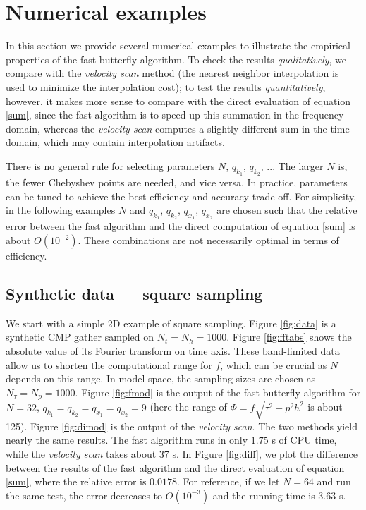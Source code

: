 

\section{Numerical examples}

In this section we provide several numerical examples to illustrate the empirical properties of the fast butterfly algorithm. To check the results {\it qualitatively}, we compare with the {\it velocity scan} method (the nearest neighbor interpolation is used to minimize the interpolation cost); to test the results {\it quantitatively}, however, it makes more sense to compare with the direct evaluation of equation \ref{sum}, since the fast algorithm is to speed up this summation in the frequency domain, whereas the {\it velocity scan} computes a slightly different sum in the time domain, which may contain interpolation artifacts.

There is no general rule for selecting parameters $N$, $q_{k_1}$, $q_{k_2}$, ... The larger $N$ is, the fewer Chebyshev points are needed, and vice versa. In practice, parameters can be tuned to achieve the best efficiency and accuracy trade-off. For simplicity, in the following examples $N$ and $q_{k_1}$, $q_{k_2}$, $q_{x_1}$, $q_{x_2}$ are chosen such that the relative error between the fast algorithm and the direct computation of equation \ref{sum} is about $O(10^{-2})$. These combinations are not necessarily optimal in terms of efficiency.



\subsection{Synthetic data --- square sampling}

We start with a simple 2D example of square sampling. Figure \ref{fig:data} is a synthetic CMP gather sampled on $N_t=N_h=1000$. Figure \ref{fig:fftabs} shows the absolute value of its Fourier transform on time axis. These band-limited data allow us to shorten the computational range for $f$, which can be crucial as $N$ depends on this range. In model space, the sampling sizes are chosen as $N_{\tau}=N_p=1000$. Figure \ref{fig:fmod} is the output of the fast butterfly algorithm for $N=32$, $q_{k_1}=q_{k_2}=q_{x_1}=q_{x_2}=9$ (here the range of $\Phi=f\sqrt{\tau^2+p^2h^2}$ is about 125). Figure \ref{fig:dimod} is the output of the {\it velocity scan}. The two methods yield nearly the same results. The fast algorithm runs in only $1.75$ s of CPU time, while the {\it velocity scan} takes about 37 s. In Figure \ref{fig:diff}, we plot the difference between the results of the fast algorithm and the direct evaluation of equation \ref{sum}, where the relative error is $0.0178$. For reference, if we let $N=64$ and run the same test, the error decreases to $O(10^{-3})$ and the running time is 3.63 s.

